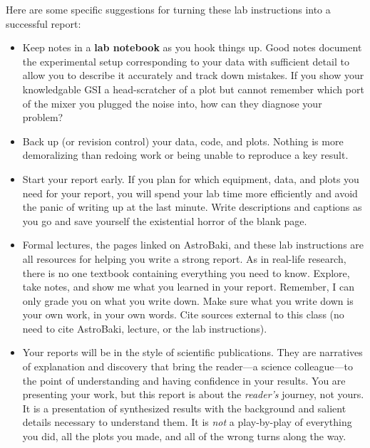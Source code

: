 \documentclass[11pt,preprint]{aastex}
\begin{document}
Here are some specific suggestions for turning these lab instructions into a successful report:
\begin{itemize}

\item Keep notes in a {\bf lab notebook} as you hook things up.
Good notes document the experimental setup corresponding to your data with sufficient
detail to allow you to describe it accurately and track down mistakes.
If you show your knowledgable GSI a head-scratcher of a plot but cannot remember
which port of the mixer you plugged the noise into, how can they diagnose your problem?

\item Back up (or revision control) your data, code, and plots. Nothing is more demoralizing than redoing work
or being unable to reproduce a key result.

\item Start your report early. If you plan for which equipment, data, and plots you need
for your report, you will spend your lab time more efficiently and avoid the 
panic of writing up at the last minute. Write descriptions and captions as you go and
save yourself the existential horror of the blank page.

\item Formal lectures, the pages linked on AstroBaki, and these lab instructions are 
all resources for helping you write a strong report. As in real-life research, there
is no one textbook containing everything you need to know. Explore, take notes, and show
me what you learned in your report. Remember, I can only grade you on what you write down.
Make sure what you write down is your own work, in your own words. Cite sources
external to this class (no need to cite AstroBaki, lecture, or the lab instructions).

\item Your reports will be in the style of scientific publications. They are narratives of explanation and discovery 
that bring the reader---a science colleague---to the point of understanding and having confidence in your results.
You are presenting your work, but this report is about the {\it reader's} journey, not yours.
It is a presentation of synthesized results with the background and salient details necessary to understand them. 
It is {\it not} a play-by-play of everything you did, all the plots you made, and all of the wrong turns along the way.

\end{itemize}
\end{document}
